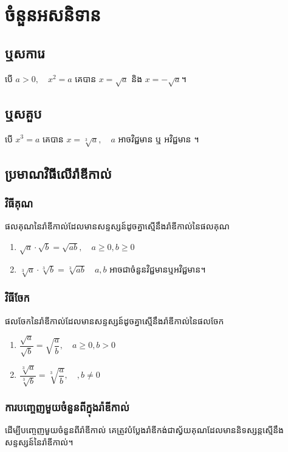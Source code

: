 \chapter{ចំនួនអសនិទាន}
\section{ឬសការេ}
\begin{general}
បើ $a>0,\quad x^2=a$ គេបាន $x=\sqrt{a}$ និង  $x=-\sqrt{a}$។
\end{general}

\section{ឬសគួប}
\begin{general}
បើ $ x^3=a$ គេបាន $x=\sqrt[3]{a},\quad a$ អាចវិជ្ជមាន ឬ អវិជ្ជមាន ។
\end{general}

\section{ប្រមាណវិធីលើរ៉ាឌីកាល់}
\subsection{វិធីគុណ}
\begin{general}
ផលគុណនៃរ៉ាឌីកាល់ដែលមានសន្ទស្សន៍ដូចគ្នាស្មើនឹងរ៉ាឌីកាល់នៃផលគុណ
\begin{enumerate}[label=\alph*.]
	\item $\sqrt{a}\cdot \sqrt{b}=\sqrt{ab},\quad a\ge 0,b\ge 0$
	\item $\sqrt[3]{a}\cdot \sqrt[3]{b}=\sqrt[3]{ab}\quad a,b$ អាចជាចំនួនវិជ្ជមានឬអវិជ្ជមាន។
\end{enumerate}
\end{general}
\subsection{វិធីចែក}
\begin{general}
ផលចែកនៃរ៉ាឌីកាល់ដែលមានសន្ទស្សន៍ដូចគ្នាស្មើនឹងរ៉ាឌីកាល់នៃផលចែក
\begin{enumerate}[label=\alph*.]
	\item $\dfrac{\sqrt{a}}{\sqrt{b}}=\sqrt{\dfrac{a}{b}},\quad a\ge 0,b> 0$
	\item $\dfrac{\sqrt[3]{a}}{\sqrt[3]{b}}=\sqrt[3]{\dfrac{a}{b}},\quad ,b\ne 0$
\end{enumerate}
\end{general}
\subsection{ការបញ្ចេញមួយចំនួនពីក្នុងរ៉ាឌីកាល់}
\begin{general}
ដើម្បីបញ្ចេញមួយចំនួនពីរ៉ាឌីកាល់ គេត្រូវបំប្លែងរ៉ាឌីកង់ជាស្វ័យគុណដែលមាននិទស្សន្តស្មើនឹងសន្ទស្សន៍នៃរ៉ាឌីកាល់។
\end{general}

